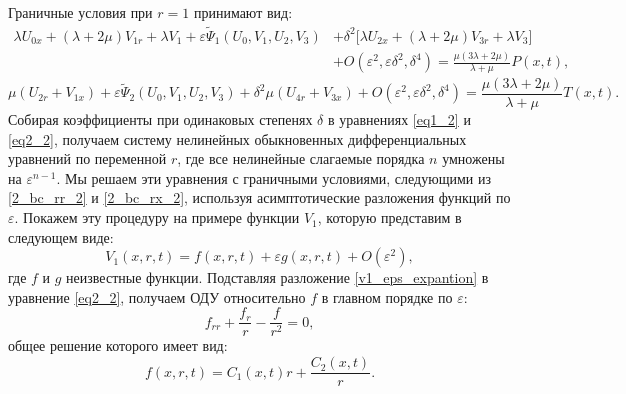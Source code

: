 \documentclass[12pt, a4paper]{report}
\newcommand{\lb}{\left (}
\newcommand{\rb}{\right )}
\renewcommand{\O}[1]{O \lb #1 \rb}
\begin{document}
Граничные условия при $r = 1$ принимают вид:
\begin{equation} \label{2_bc_rr_2}
\begin{split}
\lambda U_{0x} + (\lambda + 2\mu)V_{1r} + \lambda V_1 + \varepsilon\widetilde{\Psi}_1(U_0, V_1, U_2, V_3) &+ \delta^2\big[\lambda  U_{2x} + (\lambda + 2\mu)V_{3r} + \lambda V_3\big]\\
&+ O(\varepsilon^2, \varepsilon\delta^2, \delta^4) =  \frac{\mu(3\lambda + 2\mu)}{\lambda + \mu} P(x,t),
\end{split}
\end{equation}
\begin{equation} \label{2_bc_rx_2}
\mu \left(U_{2r} + V_{1x}\right) + \varepsilon\widetilde{\Psi}_2(U_0, V_1, U_2, V_3) + \delta^2 \mu \left(U_{4r}+V_{3x}\right) + O(\varepsilon^2, \varepsilon\delta^2, \delta^4) = \frac{\mu(3\lambda + 2\mu)}{\lambda + \mu} T(x,t).
\end{equation}
Собирая коэффициенты при одинаковых степенях $\delta$ в уравнениях \eqref{eq1_2} и \eqref{eq2_2}, получаем систему нелинейных обыкновенных дифференциальных уравнений по переменной $r$, где все нелинейные слагаемые порядка $n$ умножены на $\varepsilon^{n-1}$. Мы решаем эти уравнения с граничными условиями, следующими из \eqref{2_bc_rr_2} и \eqref{2_bc_rx_2}, используя асимптотические разложения функций по $\varepsilon$. Покажем эту процедуру на примере функции $V_1$, которую представим в следующем виде:
\begin{equation}\label{v1_eps_expantion}
V_1(x,r,t) = f(x,r,t) + \varepsilon g(x,r,t) + \O{\varepsilon^2},
\end{equation}
где $f$ и $g$ неизвестные функции. Подставляя разложение \eqref{v1_eps_expantion} в уравнение \eqref{eq2_2}, получаем ОДУ относительно $f$ в главном порядке по $\varepsilon$:
\begin{equation}\label{v1_f_ode}
f_{rr} + \frac{f_r}{r} - \frac{f}{r^2} = 0,
\end{equation}
общее решение которого имеет вид:
\begin{equation}\label{v1_f_gen_sln}
f(x,r,t) = C_1(x,t)r + \frac{C_2(x,t)}{r} .
\end{equation}
\end{document}
